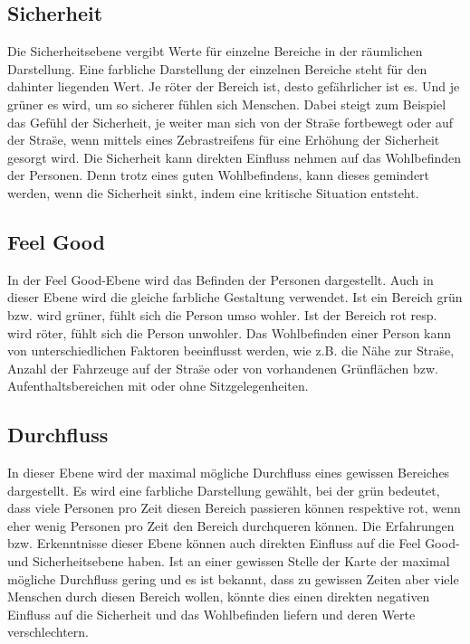 \documentclass[10pt]{scrartcl}
\begin{document}
\subsection{Sicherheit}
Die Sicherheitsebene vergibt Werte f\"ur einzelne Bereiche in der r\"aumlichen Darstellung. Eine farbliche Darstellung der einzelnen Bereiche steht f\"ur den dahinter liegenden Wert. Je r\"oter der Bereich ist, desto gef\"ahrlicher ist es. Und je gr\"uner es wird, um so sicherer f\"uhlen sich Menschen. Dabei steigt zum Beispiel das Gef\"uhl der Sicherheit, je weiter man sich von der Stra\"se fortbewegt oder auf der Stra\"se, wenn mittels eines Zebrastreifens f\"ur eine Erh\"ohung der Sicherheit gesorgt wird.
\newline Die Sicherheit kann direkten Einfluss nehmen auf das Wohlbefinden der Personen. Denn trotz eines guten Wohlbefindens, kann dieses gemindert werden, wenn die Sicherheit sinkt, indem eine kritische Situation entsteht.

\subsection{Feel Good}
In der Feel Good-Ebene wird das Befinden der Personen dargestellt. Auch in dieser Ebene wird die gleiche farbliche Gestaltung verwendet. Ist ein Bereich gr\"un bzw. wird gr\"uner, f\"uhlt sich die Person umso wohler. Ist der Bereich rot resp. wird r\"oter, f\"uhlt sich die Person unwohler. Das Wohlbefinden einer Person kann von unterschiedlichen Faktoren beeinflusst werden, wie z.B. die N\"ahe zur Stra\"se, Anzahl der Fahrzeuge auf der Stra\"se oder von vorhandenen Gr\"unfl\"achen bzw. Aufenthaltsbereichen mit oder ohne Sitzgelegenheiten.

\subsection{Durchfluss}
In dieser Ebene wird der maximal m\"ogliche Durchfluss eines gewissen Bereiches dargestellt. Es wird eine farbliche Darstellung gew\"ahlt, bei der gr\"un bedeutet, dass viele Personen pro Zeit diesen Bereich passieren k\"onnen respektive rot, wenn eher wenig Personen pro Zeit den Bereich durchqueren k\"onnen.
\newline Die Erfahrungen bzw. Erkenntnisse dieser Ebene k\"onnen auch direkten Einfluss auf die Feel Good- und Sicherheitsebene haben. Ist an einer gewissen Stelle der Karte der maximal m\"ogliche Durchfluss gering und es ist bekannt, dass zu gewissen Zeiten aber viele Menschen durch diesen Bereich wollen, k\"onnte dies einen direkten negativen Einfluss auf die Sicherheit und das Wohlbefinden liefern und deren Werte verschlechtern.
\end{document}
